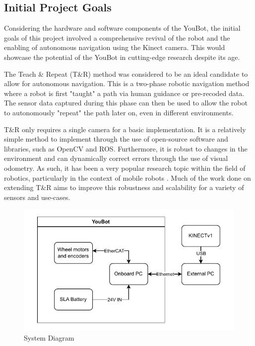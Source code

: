 \documentclass[a4paper, 12pt]{article}
\begin{document}
    \subsection{Initial Project Goals}

    Considering the hardware and software components of the YouBot, the initial goals of this project involved a comprehensive revival of the robot and the enabling of autonomous navigation using the Kinect camera. This would showcase the potential of the YouBot in cutting-edge research despite its age. 

    The Teach \& Repeat (T\&R) method \cite{Shahrivar2018} was considered to be an ideal candidate to allow for autonomous navigation. This is a two-phase robotic navigation method where a robot is first "taught" a path via human guidance or pre-recoded data. The sensor data captured during this phase can then be used to allow the robot to autonomously "repeat" the path later on, even in different environments.

    T\&R only requires a single camera for a basic implementation. It is a relatively simple method to implement through the use of open-source software and libraries, such as OpenCV and ROS. Furthermore, it is robust to changes in the environment and can dynamically correct errors through the use of visual odometry. As such, it has been a very popular research topic within the field of robotics, particularly in the context of mobile robots \cite{10611662,NITSCHE2020103577}. Much of the work done on extending T\&R aims to improve this robustness and scalability for a variety of sensors and use-cases. 

    \begin{figure}[ht]
        \centering
        \includegraphics[width=0.8\linewidth]{diagrams/sample.pdf}
        \caption{System Diagram}
        \label{fig:system-diagram}
    \end{figure}
\end{document}
